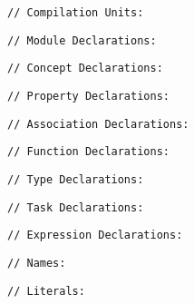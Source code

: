 \verbatimfont{\small}
\begin{verbatim}
// Compilation Units:
\end{verbatim}

\begin{verbatim}
// Module Declarations:
\end{verbatim}

\begin{verbatim}
// Concept Declarations:
\end{verbatim}

\begin{verbatim}
// Property Declarations:
\end{verbatim}

\begin{verbatim}
// Association Declarations:
\end{verbatim}

\begin{verbatim}
// Function Declarations:
\end{verbatim}

\begin{verbatim}
// Type Declarations:
\end{verbatim}

\begin{verbatim}
// Task Declarations:
\end{verbatim}

\begin{verbatim}
// Expression Declarations:
\end{verbatim}

\begin{verbatim}
// Names:
\end{verbatim}

\begin{verbatim}
// Literals:
\end{verbatim}


